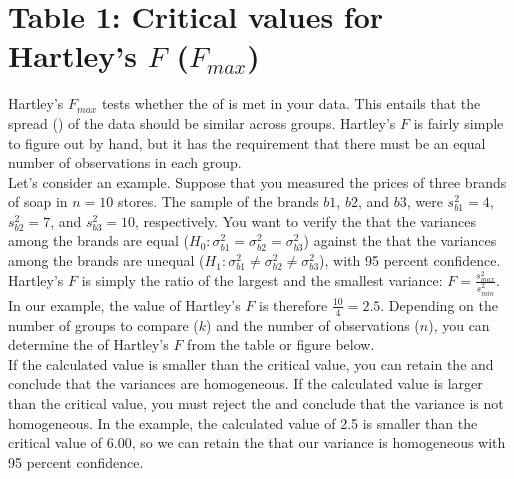 \section{Table 1: Critical values for Hartley’s $F$ ($F_{max}$)}
\label{table1}

Hartley’s $F_{max}$ tests whether the  of  is met in your data. This  entails that the spread () of the data should be similar across groups. Hartley’s $F$ is fairly simple to figure out by hand, but it has the requirement that there must be an equal number of observations in each group. \\

Let's consider an example. Suppose that you measured the prices of three brands of soap in $n = 10$ stores. The sample  of the brands $b1$, $b2$, and $b3$, were $s^2_{b1} = 4$, $s^2_{b2} = 7$, and $s^2_{b3} = 10$, respectively. You want to verify the  that the variances among the brands are equal ($H_0: \sigma^2_{b1} = \sigma^2_{b2} = \sigma^2_{b3}$) against the  that the variances among the brands are unequal ($H_1: \sigma^2_{b1} \neq \sigma^2_{b2} \neq \sigma^2_{b3}$), with 95 percent confidence. \\

Hartley's $F$ is simply the ratio of the largest and the smallest variance: $F = \frac{s^2_{max}}{s^2_{min}}$. In our example, the value of Hartley's $F$ is therefore $\frac{10}{4} = 2.5$. Depending on the number of groups to compare ($k$) and the number of observations ($n$), you can determine the  of Hartley's $F$ from the table or figure below. \\

If the calculated value is smaller than the critical value, you can retain the  and conclude that the variances are homogeneous. If the calculated value is larger than the critical value, you must reject the  and conclude that the variance is not homogeneous. In the example, the calculated value of 2.5 is smaller than the critical value of 6.00, so we can retain the  that our variance is homogeneous with 95 percent confidence. \\

